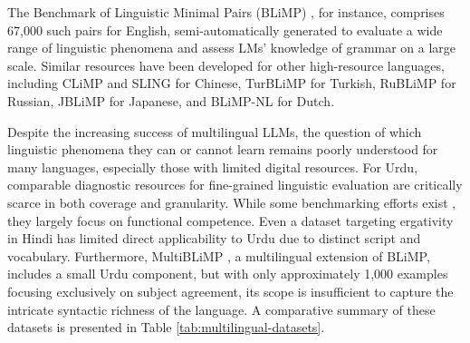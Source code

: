 \documentclass[11pt]{article}
\begin{document}
The Benchmark of Linguistic Minimal Pairs (BLiMP) \cite{blimp}, for instance, comprises 67,000 such pairs for English, semi-automatically generated to evaluate a wide range of linguistic phenomena and assess LMs' knowledge of grammar on a large scale. Similar resources have been developed for other high-resource languages, including CLiMP \cite{climp} and SLING \cite{sling} for Chinese, TurBLiMP \cite{turBlimp} for Turkish, RuBLiMP \cite{rublimp} for Russian, JBLiMP \cite{jblimp} for Japanese, and BLiMP-NL for Dutch.

Despite the increasing success of multilingual LLMs, the question of which linguistic phenomena they can or cannot learn remains poorly understood for many languages, especially those with limited digital resources. For Urdu, comparable diagnostic resources for fine-grained linguistic evaluation are critically scarce in both coverage and granularity. While some benchmarking efforts exist \cite{urdubenchmarking}, they largely focus on functional competence. Even a dataset targeting ergativity in Hindi \cite{hindiBLiMP} has limited direct applicability to Urdu due to distinct script and vocabulary. Furthermore, MultiBLiMP \cite{multiblimp}, a multilingual extension of BLiMP, includes a small Urdu component, but with only approximately 1,000 examples focusing exclusively on subject agreement, its scope is insufficient to capture the intricate syntactic richness of the language. A comparative summary of these datasets is presented in Table \ref{tab:multilingual-datasets}.
\end{document}
